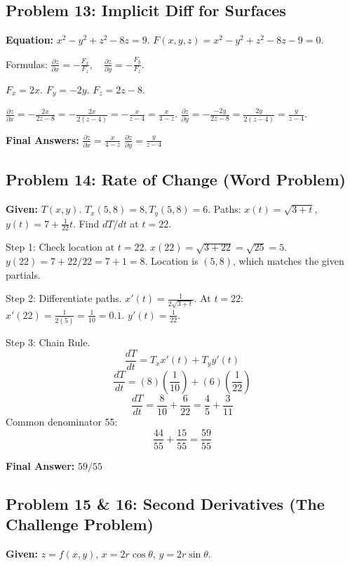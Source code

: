 \documentclass[11pt, letterpaper]{article}
\theoremstyle{definition}
\begin{document}
\subsection*{Problem 13: Implicit Diff for Surfaces}
\textbf{Equation:} $x^2 - y^2 + z^2 - 8z = 9$.
$F(x,y,z) = x^2 - y^2 + z^2 - 8z - 9 = 0$.

Formulas: $\frac{\partial z}{\partial x} = -\frac{F_x}{F_z}, \quad \frac{\partial z}{\partial y} = -\frac{F_y}{F_z}$.

$F_x = 2x$.
$F_y = -2y$.
$F_z = 2z - 8$.

$\frac{\partial z}{\partial x} = -\frac{2x}{2z - 8} = -\frac{2x}{2(z-4)} = -\frac{x}{z-4} = \frac{x}{4-z}$.
$\frac{\partial z}{\partial y} = -\frac{-2y}{2z - 8} = \frac{2y}{2(z-4)} = \frac{y}{z-4}$.

\textbf{Final Answers:}
$\frac{\partial z}{\partial x} = \boxed{\frac{x}{4-z}}$
$\frac{\partial z}{\partial y} = \boxed{\frac{y}{z-4}}$


\subsection*{Problem 14: Rate of Change (Word Problem)}
\textbf{Given:} $T(x,y)$. $T_x(5,8)=8, T_y(5,8)=6$.
Paths: $x(t) = \sqrt{3+t}$, $y(t) = 7 + \frac{1}{22}t$.
Find $dT/dt$ at $t=22$.

Step 1: Check location at $t=22$.
$x(22) = \sqrt{3+22} = \sqrt{25} = 5$.
$y(22) = 7 + 22/22 = 7+1 = 8$.
Location is $(5,8)$, which matches the given partials.

Step 2: Differentiate paths.
$x'(t) = \frac{1}{2\sqrt{3+t}}$. At $t=22$: $x'(22) = \frac{1}{2(5)} = \frac{1}{10} = 0.1$.
$y'(t) = \frac{1}{22}$.

Step 3: Chain Rule.
\[ \frac{dT}{dt} = T_x x'(t) + T_y y'(t) \]
\[ \frac{dT}{dt} = (8)\left(\frac{1}{10}\right) + (6)\left(\frac{1}{22}\right) \]
\[ \frac{dT}{dt} = \frac{8}{10} + \frac{6}{22} = \frac{4}{5} + \frac{3}{11} \]
Common denominator 55:
\[ \frac{44}{55} + \frac{15}{55} = \frac{59}{55} \]

\textbf{Final Answer:} $\boxed{59/55}$


\subsection*{Problem 15 & 16: Second Derivatives (The Challenge Problem)}
\textbf{Given:} $z = f(x,y)$, $x = 2r\cos\theta$, $y = 2r\sin\theta$.
\end{document}
